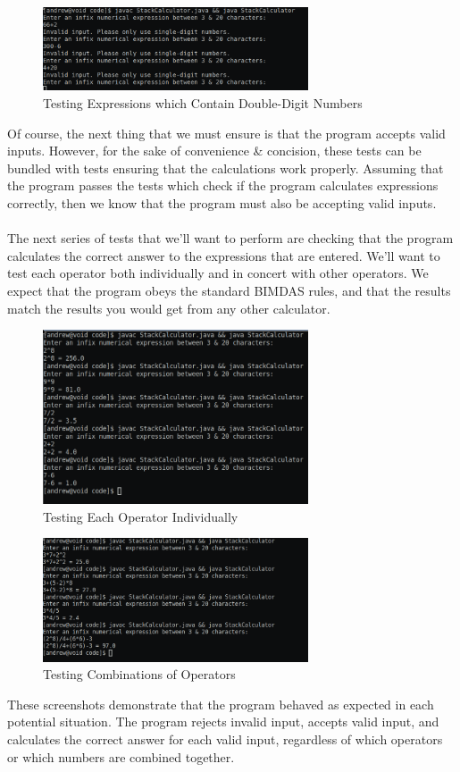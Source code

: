 \documentclass[a4paper]{article}
\begin{document}
\begin{figure}[h]
    \centering
    \includegraphics[width=0.7\textwidth]{images/doubledigit.png}
    \caption{Testing Expressions which Contain Double-Digit Numbers}
\end{figure}

Of course, the next thing that we must ensure is that the program accepts valid inputs. 
However, for the sake of convenience \& concision, these tests can be bundled with tests ensuring that the calculations 
work properly. 
Assuming that the program passes the tests which check if the program calculates expressions correctly, then we know 
that the program must also be accepting valid inputs.
\\\\
The next series of tests that we'll want to perform are checking that the program calculates the correct answer to the 
expressions that are entered. 
We'll want to test each operator both individually and in concert with other operators.
We expect that the program obeys the standard BIMDAS rules, and that the results match the results you would get from 
any other calculator. 

\begin{figure}[h]
    \centering
    \includegraphics[width=0.7\textwidth]{images/individualoperators.png}
    \caption{Testing Each Operator Individually}
\end{figure}

\begin{figure}[h]
    \centering
    \includegraphics[width=0.7\textwidth]{images/inconcert.png}
    \caption{Testing Combinations of Operators}
\end{figure}

These screenshots demonstrate that the program behaved as expected in each potential situation. 
The program rejects invalid input, accepts valid input, and calculates the correct answer for each valid input, 
regardless of which operators or which numbers are combined together.
\end{document}
